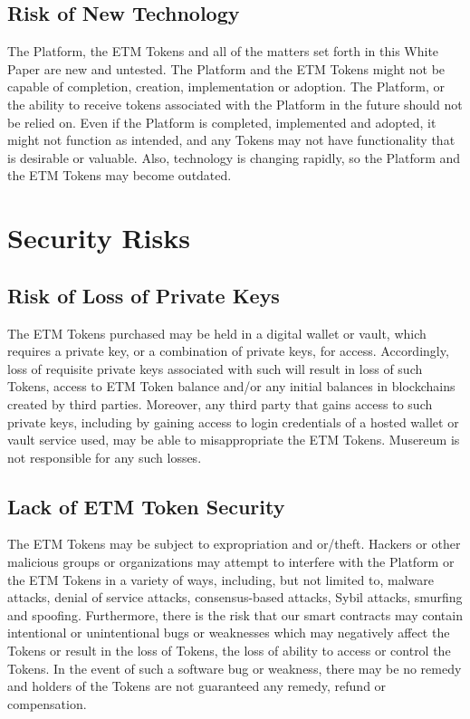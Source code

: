 \documentclass[12pt]{report}
\begin{document}
\subsection*{Risk of New Technology}
The Platform, the ETM Tokens and all of the matters set forth in this White Paper are new and untested. The Platform and the ETM Tokens might not be capable of completion, creation, implementation or adoption. The Platform, or the ability to receive tokens associated with the Platform in the future should not be relied on. Even if the Platform is completed, implemented and adopted, it might not function as intended, and any Tokens may not have functionality that is desirable or valuable. Also, technology is changing rapidly, so the Platform and the ETM Tokens may become outdated.

\section{Security Risks}

\subsection*{Risk of Loss of Private Keys}
The ETM Tokens purchased may be held in a digital wallet or vault, which requires a private key, or a combination of private keys, for access. Accordingly, loss of requisite private keys associated with such will result in loss of such Tokens, access to ETM Token balance and/or any initial balances in blockchains created by third parties. Moreover, any third party that gains access to such private keys, including by gaining access to login credentials of a hosted wallet or vault service used, may be able to misappropriate the ETM Tokens. Musereum is not responsible for any such losses.

\subsection*{Lack of ETM Token Security}
The ETM Tokens may be subject to expropriation and or/theft. Hackers or other malicious groups or organizations may attempt to interfere with the Platform or the ETM Tokens in a variety of ways, including, but not limited to, malware attacks, denial of service attacks, consensus-based attacks, Sybil attacks, smurfing and spoofing. Furthermore, there is the risk that our smart contracts may contain intentional or unintentional bugs or weaknesses which may negatively affect the Tokens or result in the loss of Tokens, the loss of ability to access or control the Tokens. In the event of such a software bug or weakness, there may be no remedy and holders of the Tokens are not guaranteed any remedy, refund or compensation.
\end{document}
